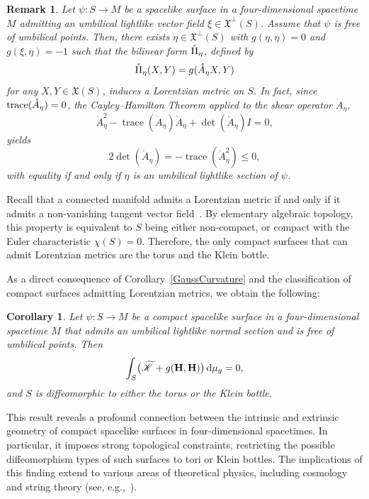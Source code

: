 \documentclass[11pt]{article}
\numberwithin{equation}{section}
\newtheorem{corollary}[theorem]{Corollary}
\newtheorem{remark}[theorem]{Remark}
\begin{document}
	\begin{remark}
		\normalfont
		Let $\psi \colon S \to M$ be a spacelike surface in a four-dimensional spacetime $M$ admitting an umbilical lightlike vector field $\xi \in {\mathfrak X}^\perp(S)$. Assume that $\psi$ is free of umbilical points. Then, there exists $\eta \in {\mathfrak X}^\perp(S)$ with $g(\eta,\eta)=0$ and $g(\xi, \eta)=-1$ such that the bilinear form $\mathring{\rm II}_\eta$, defined by
		\begin{equation*}
			\mathring{\rm II}_\eta(X,Y) = g(\mathring{A}_\eta X, Y)
		\end{equation*}
		for any $X,Y \in {\mathfrak X}(S)$, induces a Lorentzian metric on $S$. In fact, since ${\rm trace}(\mathring{A}_\eta) = 0$, the Cayley--Hamilton Theorem applied to the shear operator $\mathring{A}_\eta$,
		\[
		\mathring{A}_\eta^2 - \operatorname{trace}(\mathring{A}_\eta) \mathring{A}_\eta + \operatorname{det}(\mathring{A}_\eta)I = 0,
		\]
		yields
		\[
		2 \operatorname{det}(\mathring{A}_\eta) = - \operatorname{trace}(\mathring{A}_\eta^2) \leq 0,
		\]
		with equality if and only if $\eta$ is an umbilical lightlike section of $\psi$.
	\end{remark}
	
	
	Recall that a connected manifold admits a Lorentzian metric if and only if it admits a non-vanishing tangent vector field~\cite[Prop.~5.37]{oneill}. By elementary algebraic topology, this property is equivalent to $S$ being either non-compact, or compact with the Euler characteristic $\chi(S) = 0$. Therefore, the only compact surfaces that can admit Lorentzian metrics are the torus and the Klein bottle.
	
	As a direct consequence of Corollary~\ref{GaussCurvature} and the classification of compact surfaces admitting Lorentzian metrics, we obtain the following:
	
	\begin{corollary}\label{TorusKlein}
		Let $\psi \colon S \to M$ be a compact spacelike surface in a four-dimensional spacetime $M$ that admits an umbilical lightlike normal section and is free of umbilical points. Then
		\begin{equation*}
			\int_S \bigl(\widetilde{\mathscr{K}} + g(\mathbf{H}, \mathbf{H}) \bigr)\,{\rm d} \mu_g = 0,
		\end{equation*}
		and $S$ is diffeomorphic to either the torus or the Klein bottle.
	\end{corollary}
	
	
	This result reveals a profound connection between the intrinsic and extrinsic geometry of compact spacelike surfaces in four-dimensional spacetimes. In particular, it imposes strong topological constraints, restricting the possible diffeomorphism types of such surfaces to tori or Klein bottles. The implications of this finding extend to various areas of theoretical physics, including cosmology and string theory (see, e.g.,~\cite{GonzalezAlonso}).
	
\end{document}
